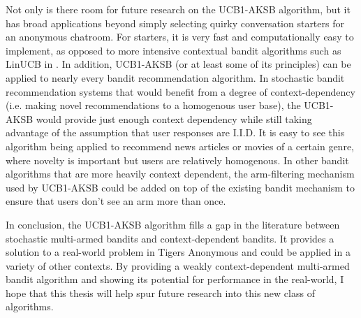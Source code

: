 Not only is there room for future research on the UCB1-AKSB algorithm, but it has broad applications beyond simply selecting quirky conversation starters for an anonymous chatroom. For starters, it is very fast and computationally easy to implement, as opposed to more intensive contextual bandit algorithms such as LinUCB in \citet{chu10}. In addition, UCB1-AKSB (or at least some of its principles) can be applied to nearly every bandit recommendation algorithm. In stochastic bandit recommendation systems that would benefit from a degree of context-dependency (i.e. making novel recommendations to a homogenous user base), the UCB1-AKSB would provide just enough context dependency while still taking advantage of the assumption that user responses are I.I.D. It is easy to see this algorithm being applied to recommend news articles or movies of a certain genre, where novelty is important but users are relatively homogenous. In other bandit algorithms that are more heavily context dependent, the arm-filtering mechanism used by UCB1-AKSB could be added on top of the existing bandit mechanism to ensure that users don't see an arm more than once.

In conclusion, the UCB1-AKSB algorithm fills a gap in the literature between stochastic multi-armed bandits and context-dependent bandits. It provides a solution to a real-world problem in Tigers Anonymous and could be applied in a variety of other contexts. By providing a weakly context-dependent multi-armed bandit algorithm and showing its potential for performance in the real-world, I hope that this thesis will help spur future research into this new class of algorithms.

